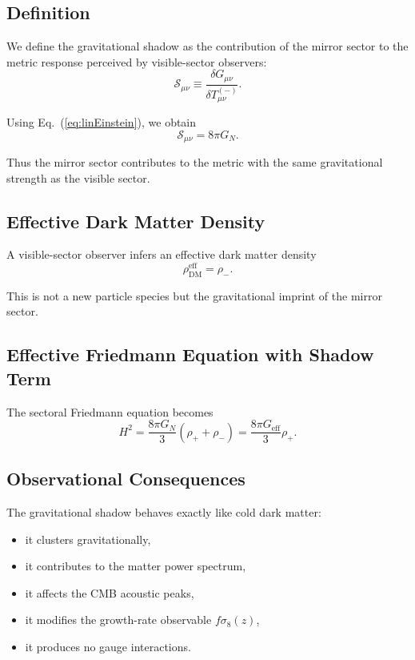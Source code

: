 \documentclass[11pt,a4paper]{article}
\begin{document}
\subsection{Definition}

We define the gravitational shadow as the contribution of the mirror sector to the metric response perceived by visible-sector observers:
\begin{equation}
\mathcal{S}_{\mu\nu} \equiv 
\frac{\delta G_{\mu\nu}}{\delta T_{\mu\nu}^{(-)}}.
\end{equation}

Using Eq.~(\ref{eq:linEinstein}), we obtain
\begin{equation}
\mathcal{S}_{\mu\nu} = 8\pi G_N.
\end{equation}

Thus the mirror sector contributes to the metric with the same gravitational strength as the visible sector.

\subsection{Effective Dark Matter Density}

A visible-sector observer infers an effective dark matter density
\begin{equation}
\rho_{\mathrm{DM}}^{\mathrm{eff}} = \rho_-.
\end{equation}

This is not a new particle species but the gravitational imprint of the mirror sector.

\subsection{Effective Friedmann Equation with Shadow Term}

The sectoral Friedmann equation becomes
\begin{equation}
H^2 = \frac{8\pi G_N}{3} (\rho_+ + \rho_-)
= \frac{8\pi G_{\mathrm{eff}}}{3} \rho_+.
\end{equation}

\subsection{Observational Consequences}

The gravitational shadow behaves exactly like cold dark matter:

\begin{itemize}
\item it clusters gravitationally,
\item it contributes to the matter power spectrum,
\item it affects the CMB acoustic peaks,
\item it modifies the growth-rate observable $f\sigma_8(z)$,
\item it produces no gauge interactions.
\end{itemize}
\end{document}
